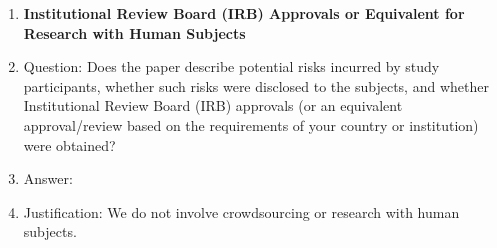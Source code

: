 \documentclass[nohyperref]{article}
\theoremstyle{plain}
\theoremstyle{remark}
\begin{document}
\begin{enumerate}
\item {\bf Institutional Review Board (IRB) Approvals or Equivalent for Research with Human Subjects}
    \item[] Question: Does the paper describe potential risks incurred by study participants, whether such risks were disclosed to the subjects, and whether Institutional Review Board (IRB) approvals (or an equivalent approval/review based on the requirements of your country or institution) were obtained?
    \item[] Answer: \answerNA{} %
    \item[] Justification: We do not involve crowdsourcing or research with human subjects.
\end{enumerate}
\end{document}
